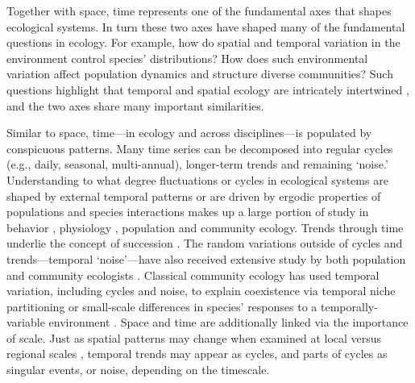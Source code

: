 \documentclass[11pt,a4paper,oneside]{article}
\begin{document}
Together with space, time represents one of the fundamental axes that shapes ecological systems. In turn these two axes have shaped many of the fundamental questions in ecology. For example, how do spatial and temporal variation in the environment control species' distributions? How does such environmental variation affect population dynamics and structure diverse communities? Such questions highlight that temporal and spatial ecology are intricately intertwined \citep{delcourt1983}, and the two axes share many important similarities.

Similar to space, time---in ecology and across disciplines---is populated by conspicuous patterns. Many time series can be decomposed into regular cycles (e.g., daily, seasonal, multi-annual), longer-term trends and remaining `noise.'  Understanding to what degree fluctuations or cycles in ecological systems are shaped by external temporal patterns or are driven by ergodic properties of populations and species interactions makes up a large portion of study in behavior \citep{macarthur1958}, physiology \citep{Lambers:2008jb}, population  \citep{May1976} and community \citep{Chesson:1997dz} ecology. Trends through time underlie the concept of succession \citep{clementsbook}.  The random variations outside of cycles and trends---temporal `noise'---have also received extensive study by both population \citep{Kaitala1997,Bjornstad:1999kl} and community ecologists \citep{Chesson:1997dz}. Classical community ecology has used temporal variation, including cycles and noise, to explain coexistence via temporal niche partitioning or small-scale differences in species' responses to a temporally-variable environment \citep{macarthur1958,Hutchinson:1961ui,Chesson:1997dz}. Space and time are additionally linked via the importance of scale. Just as spatial patterns may change when examined at local versus regional scales \citep[e.g.,][]{Fridley:2007ct}, temporal trends may appear as cycles, and parts of cycles as singular events, or noise, depending on the timescale. 
\end{document}

